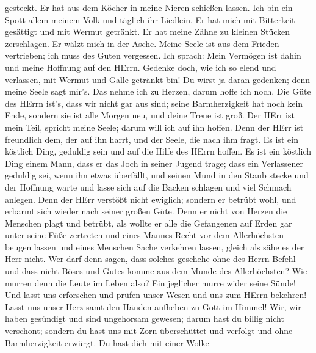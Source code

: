 gesteckt.  Er hat aus dem Köcher in meine Nieren schießen
lassen.  Ich bin ein Spott allem meinem Volk und täglich
ihr Liedlein.  Er hat mich mit Bitterkeit gesättigt und mit
Wermut getränkt.  Er hat meine Zähne zu kleinen Stücken
zerschlagen. Er wälzt mich in der Asche.  Meine Seele ist
aus dem Frieden vertrieben; ich muss des Guten vergessen. 
Ich sprach: Mein Vermögen ist dahin und meine Hoffnung auf den HErrn.
 Gedenke doch, wie ich so elend und verlassen, mit Wermut
und Galle getränkt bin!  Du wirst ja daran gedenken; denn
meine Seele sagt mir's.  Das nehme ich zu Herzen, darum
hoffe ich noch.  Die Güte des HErrn ist's, dass wir nicht
gar aus sind; seine Barmherzigkeit hat noch kein Ende, 
sondern sie ist alle Morgen neu, und deine Treue ist groß. 
Der HErr ist mein Teil, spricht meine Seele; darum will ich auf ihn
hoffen.  Denn der HErr ist freundlich dem, der auf ihn
harrt, und der Seele, die nach ihm fragt.  Es ist ein
köstlich Ding, geduldig sein und auf die Hilfe des HErrn hoffen.
 Es ist ein köstlich Ding einem Mann, dass er das Joch in
seiner Jugend trage;  dass ein Verlassener geduldig sei,
wenn ihn etwas überfällt,  und seinen Mund in den Staub
stecke und der Hoffnung warte  und lasse sich auf die
Backen schlagen und viel Schmach anlegen.  Denn der HErr
verstößt nicht ewiglich;  sondern er betrübt wohl, und
erbarmt sich wieder nach seiner großen Güte.  Denn er nicht
von Herzen die Menschen plagt und betrübt,  als wollte er
alle die Gefangenen auf Erden gar unter seine Füße zertreten
 und eines Mannes Recht vor dem Allerhöchsten beugen lassen
 und eines Menschen Sache verkehren lassen, gleich als sähe
es der Herr nicht.  Wer darf denn sagen, dass solches
geschehe ohne des Herrn Befehl  und dass nicht Böses und
Gutes komme aus dem Munde des Allerhöchsten?  Wie murren
denn die Leute im Leben also? Ein jeglicher murre wider seine Sünde!
 Und lasst uns erforschen und prüfen unser Wesen und uns
zum HErrn bekehren!  Lasst uns unser Herz samt den Händen
aufheben zu Gott im Himmel!  Wir, wir haben gesündigt und
sind ungehorsam gewesen; darum hast du billig nicht verschont;
 sondern du hast uns mit Zorn überschüttet und verfolgt und
ohne Barmherzigkeit erwürgt.  Du hast dich mit einer Wolke

